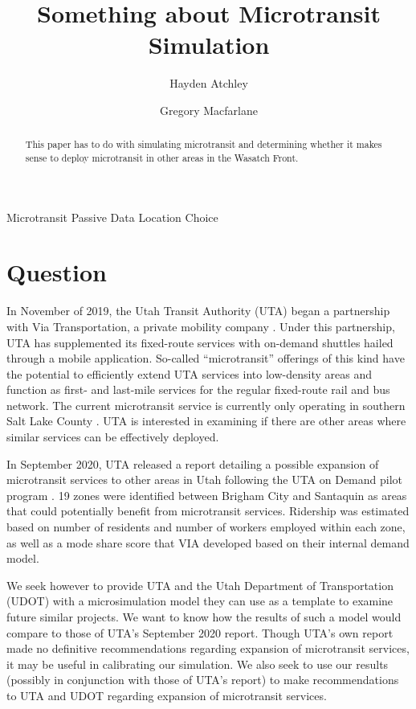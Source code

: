 \documentclass[3p, authoryear]{elsarticle} %
\begin{document}
\begin{frontmatter}

  \title{Something about Microtransit Simulation}
    \author[Brigham Young University]{Hayden Atchley}
    \author[Brigham Young University]{Gregory Macfarlane}
      \address[Brigham Young University]{Civil and Construction Engineering Department, 430 Engineering Building, Provo, Utah 84602}
    
  \begin{abstract}
  This paper has to do with simulating microtransit and determining whether it makes sense to deploy microtransit in other areas in the Wasatch Front.
  \end{abstract}
   \begin{keyword} Microtransit Passive Data Location Choice\end{keyword}
 \end{frontmatter}

\hypertarget{question}{%
\section{Question}\label{question}}

In November of 2019, the Utah Transit Authority (UTA) began a partnership with Via Transportation, a private mobility company \citep{UTAreport}.
Under this partnership, UTA has supplemented its fixed-route services with on-demand shuttles hailed through a mobile application.
So-called ``microtransit'' offerings of this kind have the potential to efficiently extend UTA services into low-density areas and function as first- and last-mile services for the regular fixed-route rail and bus network.
The current microtransit service is currently only operating in southern Salt Lake County \citep{UTAonDemand}.
UTA is interested in examining if there are other areas where similar services can be effectively deployed.

In September 2020, UTA released a report detailing a possible expansion of microtransit services to other areas in Utah following the UTA on Demand pilot program \citep{UTAreport}.
19 zones were identified between Brigham City and Santaquin as areas that could potentially benefit from microtransit services.
Ridership was estimated based on number of residents and number of workers employed within each zone, as well as a mode share score that VIA developed based on their internal demand model.

We seek however to provide UTA and the Utah Department of Transportation (UDOT) with a microsimulation model they can use as a template to examine future similar projects.
We want to know how the results of such a model would compare to those of UTA's September 2020 report.
Though UTA's own report made no definitive recommendations regarding expansion of microtransit services, it may be useful in calibrating our simulation.
We also seek to use our results (possibly in conjunction with those of UTA's report) to make recommendations to UTA and UDOT regarding expansion of microtransit services.
\end{document}
